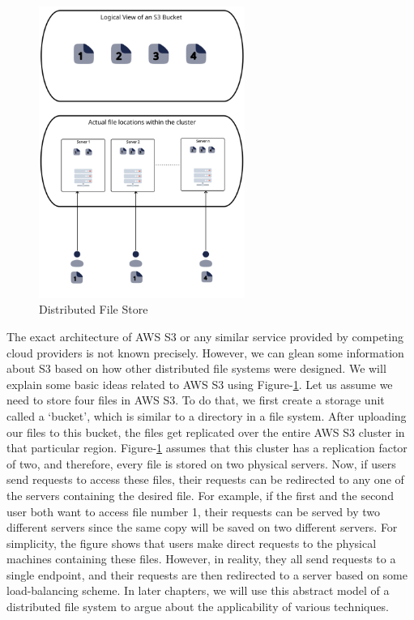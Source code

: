 \begin{figure}[ht]
    \centering
    \includegraphics[width=0.6\textwidth]{figures/distributedCloudStorage.png}
    \caption{Distributed File Store}
    \label{fig:distFileStore}
\end{figure}

\medskip
The exact architecture of AWS S3 or any similar service provided by
competing cloud providers is not known precisely. However, we can glean some information
about S3 based on
how other distributed file systems were designed. We will explain some basic ideas
related to AWS S3 using Figure-\ref{fig:distFileStore}. Let us assume we need to
store four files in AWS S3. To do that, we first create a storage unit
called a `bucket', which is similar to a directory in a file system. After
uploading our files to this bucket, the files get replicated over the entire AWS S3 cluster in
that particular region. Figure-\ref{fig:distFileStore} assumes that this cluster
has a replication factor of two, and therefore, every file is stored on two
physical servers. Now, if users send requests to access these files, their
requests can be redirected to any one of the servers containing the desired file. For
example, if the first and the second user both want to access file number 1, their
requests can be served by two different servers since the same copy will be
saved on two different servers. For simplicity, the figure shows that users make
direct requests to the physical machines containing these files. However, in
reality, they all send requests to a single endpoint, and their requests are then
redirected to a server based on some load-balancing scheme. In later chapters,
we will use this abstract model of a distributed file system to argue about the
applicability of various techniques.

